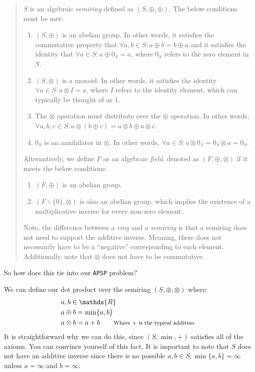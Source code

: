 \documentclass[12pt]{article}
\begin{document}
\begin{quote}
    $S$ is an algebraic \emph{semiring} defined as $(S, \oplus, \otimes)$. The below conditions must be met:

    \begin{enumerate}
        \item $(S, \oplus)$ is an abelian group. In other words, it satisfies the commutative property that $\forall a, b \in S : a \oplus b = b \oplus a$ and it satisfies the identity that $\forall a \in S : a \oplus 0_S = a$, where $0_S$ refers to the zero element in $S$.
        \item $(S, \otimes)$ is a monoid. In other words, it satisfies the identity $\forall a \in S : a \otimes I = a$, where $I$ refers to the identity element, which can typically be thought of as 1.
        \item The $\otimes$ operation must distribute over the $\oplus$ operation. In other words, $\forall a, b, c \in S : a \otimes (b \oplus c) = a \otimes b \oplus a \otimes c$.
        \item $0_S$ is an annihilator in $\otimes$. In other words, $\forall a \in S : a \otimes 0_S = 0_S \otimes a = 0_S$.
    \end{enumerate}

    Alternatively, we define $F$ as an algebraic \emph{field}, denoted as $(F, \oplus, \otimes)$ if it meets the below conditions:

    \begin{enumerate}
        \item $(F, \oplus)$ is an abelian group.
        \item $(F \backslash \{0\}, \otimes)$ is also an abelian group, which implies the existence of a multiplicative inverse for every non-zero element.
    \end{enumerate}

    {\footnotesize Note, the difference between a \emph{ring} and a \emph{semiring} is that a semiring does not need to support the additive inverse. Meaning, there does not necessarily have to be a ``negative'' corresponding to each element. Additionally, note that $\otimes$ does not have to be commutative.}
\end{quote}

So how does this tie into our \texttt{APSP} problem?

We can define our dot product over the semiring $(S, \oplus, \otimes)$ where:
\[
    \begin{split}
        & a, b \in \mathds{R} \\
        & a \oplus b = \min\{a, b\} \\
        & a \otimes b = a + b \qquad \text{{\footnotesize Where + is the typical addition}}
    \end{split}
\]
It is straightforward why we can do this, since $(S, \min, +)$ satisfies all of the axioms. You can convince yourself of this fact. It is important to note that $S$ does not have an additive inverse since there is no possible $a, b \in S : \min\{a, b\} = \infty$ unless $a = \infty$ and $b = \infty$.
\end{document}
